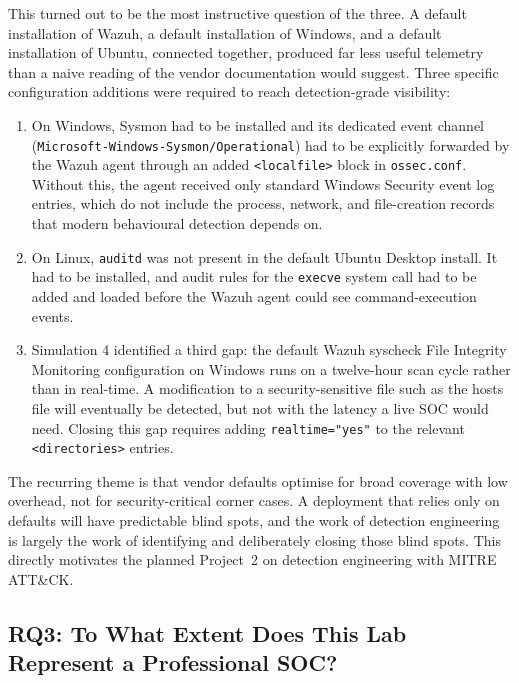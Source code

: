 This turned out to be the most instructive question of the three. A default
installation of Wazuh, a default installation of Windows, and a default
installation of Ubuntu, connected together, produced far less useful
telemetry than a naive reading of the vendor documentation would suggest.
Three specific configuration additions were required to reach
detection-grade visibility:

\begin{enumerate}[label=\textbf{\arabic*.},leftmargin=*]
    \item On Windows, Sysmon had to be installed and its dedicated event
          channel (\texttt{Microsoft-Windows-Sysmon/Operational}) had to be
          explicitly forwarded by the Wazuh agent through an added
          \texttt{<localfile>} block in \texttt{ossec.conf}. Without this,
          the agent received only standard Windows Security event log
          entries, which do not include the process, network, and
          file-creation records that modern behavioural detection depends
          on.
    \item On Linux, \texttt{auditd} was not present in the default Ubuntu
          Desktop install. It had to be installed, and audit rules for the
          \texttt{execve} system call had to be added and loaded before the
          Wazuh agent could see command-execution events.
    \item Simulation 4 identified a third gap: the default Wazuh syscheck
          File Integrity Monitoring configuration on Windows runs on a
          twelve-hour scan cycle rather than in real-time. A modification
          to a security-sensitive file such as the hosts file will
          eventually be detected, but not with the latency a live SOC would
          need. Closing this gap requires adding
          \texttt{realtime="yes"} to the relevant
          \texttt{<directories>} entries.
\end{enumerate}

The recurring theme is that vendor defaults optimise for broad coverage with
low overhead, not for security-critical corner cases. A deployment that
relies only on defaults will have predictable blind spots, and the work of
detection engineering is largely the work of identifying and deliberately
closing those blind spots. This directly motivates the planned Project~2 on
detection engineering with MITRE ATT\&CK.

\subsection{RQ3: To What Extent Does This Lab Represent a Professional SOC?}

